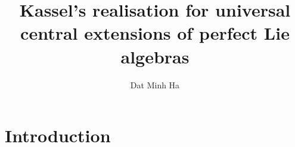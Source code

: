 

\setcounter{section}{-1}





    \title{Kassel's realisation for universal central extensions of perfect Lie algebras}
    
    \author{Dat Minh Ha}
    \maketitle
    
    \begin{abstract}
    
    \end{abstract}
    
    {
    \hypersetup{} 
    \tableofcontents %
    }

    \section{Introduction}

    

    
    
    \printbibliography


